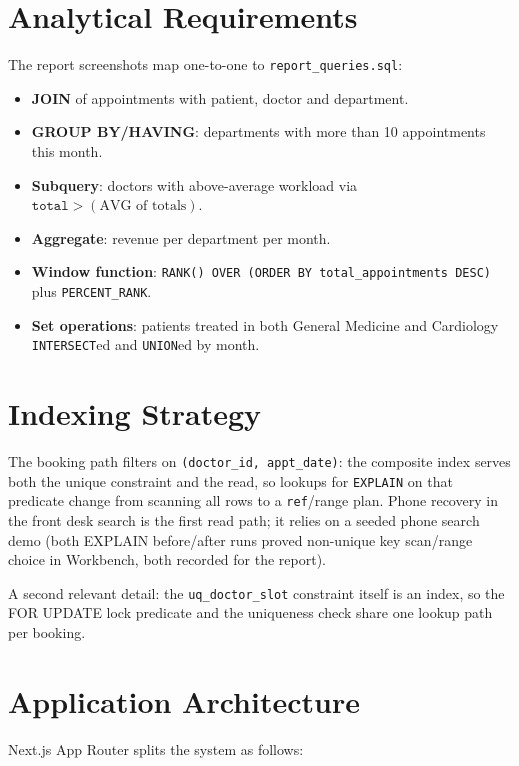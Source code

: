 \documentclass[11pt]{article}
\begin{document}
\section{Analytical Requirements}
The report screenshots map one-to-one to \texttt{report\_queries.sql}:

\begin{itemize}
  \item \textbf{JOIN} of appointments with patient, doctor and department.
  \item \textbf{GROUP BY/HAVING}: departments with more than 10 appointments
        this month.
  \item \textbf{Subquery}: doctors with above-average workload via
        $\texttt{total} > (\text{AVG of totals})$.
  \item \textbf{Aggregate}: revenue per department per month.
  \item \textbf{Window function}: \texttt{RANK() OVER (ORDER BY
        total\_appointments DESC)} plus \texttt{PERCENT\_RANK}.
  \item \textbf{Set operations}: patients treated in both General Medicine
        and Cardiology \texttt{INTERSECT}ed and \texttt{UNION}ed by month.
\end{itemize}

\section{Indexing Strategy}
The booking path filters on \texttt{(doctor\_id, appt\_date)}: the
composite index serves both the unique constraint and the read, so lookups
for \texttt{EXPLAIN} on that predicate change from scanning all rows to a
\texttt{ref}/{range} plan. Phone recovery in the front desk search is the
first read path; it relies on a seeded phone search demo (both EXPLAIN
before/after runs proved non-unique key scan/range choice in Workbench,
both recorded for the report).

A second relevant detail: the \texttt{uq\_doctor\_slot} constraint itself is
an index, so the FOR UPDATE lock predicate and the uniqueness check share
one lookup path per booking.

\section{Application Architecture}
Next.js App Router splits the system as follows:
\end{document}
